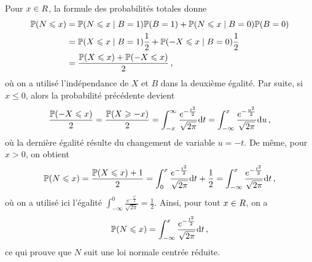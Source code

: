 \documentclass[11pt]{td_um}
\begin{document}
\begin{exo}{}
\begin{enumerate}
{			Pour $x \in \R$, la formule des probabilités totales donne
			\begin{align*}
			\P(N \leq x)
			&= \P(N \leq x \mid B=1) \P(B=1) + \P(N \leq x \mid B=0) \P(B=0)\\
			&= \P(X \leq x \mid B=1) \dfrac{1}{2} + \P(-X \leq x \mid B=0) \dfrac{1}{2}\\\
			&= \dfrac{ \P(X \leq x) + \P(-X \leq x)}{2}\,,
			\end{align*}
			où on a utilisé l'indépendance de $X$ et $B$ dans la deuxième égalité. Par suite, si $x \leq 0$, alors la probabilité précédente devient
			\[
			\dfrac{\P(-X \leq x)}{2}
			= \dfrac{\P(X \geq -x)}{2}
			= \int_{-x}^\infty \dfrac{e^{-\frac{t^2}{2}}}{\sqrt{2 \pi}} \mathrm dt
			= \int_{-\infty}^x \dfrac{e^{-\frac{u^2}{2}}}{\sqrt{2 \pi}} \mathrm du\,,
			\]
			où la dernière égalité résulte du changement de variable $u=-t$. De même, pour $x > 0$, on obtient
			\[
			\P(N \leq x)
			= \dfrac{ \P(X \leq x) + 1}{2}
			= \int_{0}^x \dfrac{e^{-\frac{t^2}{2}}}{\sqrt{2 \pi}} \mathrm dt + \dfrac{1}{2}
			= \int_{-\infty}^x \dfrac{e^{-\frac{t^2}{2}}}{\sqrt{2 \pi}} \mathrm dt\,,
			\]
			où on a utilisé ici l'égalité $\int_{-\infty}^0 \frac{e^{-\frac{t^2}{2}}}{\sqrt{2 \pi}} = \frac{1}{2}$. Ainsi, pour tout $x \in \R$, on a
			\[
			\P(N \leq x) = \int_{-\infty}^x \dfrac{e^{-\frac{t^2}{2}}}{\sqrt{2 \pi}} \mathrm dt\,,
			\]
			ce qui prouve que $N$ suit une loi normale centrée réduite.
		}
	\end{enumerate}
\end{exo}
\end{document}
